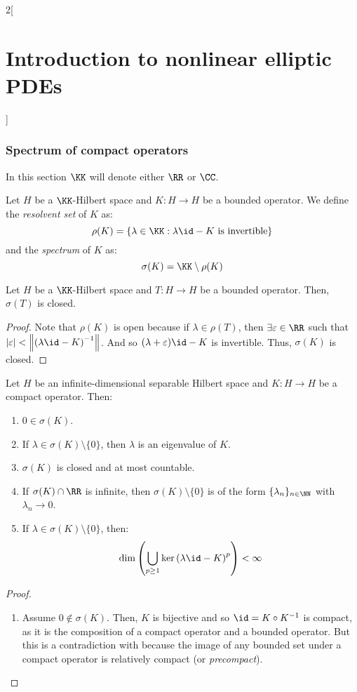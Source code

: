 \documentclass[../../../main_math.tex]{subfiles}
\begin{document}
\begin{multicols}{2}[\section{Introduction to nonlinear elliptic PDEs}]
  \subsubsection{Spectrum of compact operators}
  In this section $\KK$ will denote either $\RR$ or $\CC$.
  \begin{definition}
    Let $H$ be a $\KK$-Hilbert space and $K:H\to H$ be a bounded operator. We define the \emph{resolvent set} of $K$ as:
    $$
      \rho(K)=\{\lambda\in \KK: \lambda\id-K \text{ is invertible}\}
    $$
    and the \emph{spectrum} of $K$ as:
    $$
      \sigma(K)=\KK\setminus \rho(K)
    $$
  \end{definition}
  \begin{proposition}
    Let $H$ be a $\KK$-Hilbert space and $T:H\to H$ be a bounded operator. Then, $\sigma(T)$ is closed.
  \end{proposition}
  \begin{proof}
    Note that $\rho(K)$ is open because if $\lambda\in \rho(T)$, then $\exists\varepsilon\in\RR$ such that $\abs{\varepsilon} < \norm{{(\lambda\id-K)}^{-1}}$. And so $(\lambda+\varepsilon)\id-K$ is invertible. Thus, $\sigma(K)$ is closed.
  \end{proof}
  \begin{theorem}
    Let $H$ be an infinite-dimensional separable Hilbert space and $K:H\to H$ be a compact operator. Then:
    \begin{enumerate}
      \item $0\in \sigma(K)$.
      \item\label{INEPDE:item2_spectrum} If $\lambda\in \sigma(K)\setminus\{0\}$, then $\lambda$ is an eigenvalue of $K$.
      \item $\sigma(K)$ is closed and at most countable.
      \item If $\sigma(K)\cap\RR$ is infinite, then $\sigma(K)\setminus\{0\}$ is of the form $\{\lambda_n\}_{n\in \NN}$ with $\lambda_n\to 0$.
      \item If $\lambda\in \sigma(K)\setminus\{0\}$, then:
            $$
              \dim\left(\bigcup_{p\geq 1}\ker{(\lambda\id-K)}^p\right)<\infty
            $$
    \end{enumerate}
  \end{theorem}
  \begin{proof}
    \begin{enumerate}
      \item Assume $0\notin \sigma(K)$. Then, $K$ is bijective and so $\id = K\circ K^{-1}$ is compact, as it is the composition of a compact operator and a bounded operator. But this is a contradiction with  because the image of any bounded set under a compact operator is relatively compact (or \emph{precompact}).

\end{enumerate}
\end{proof}
\end{multicols}
\end{document}
